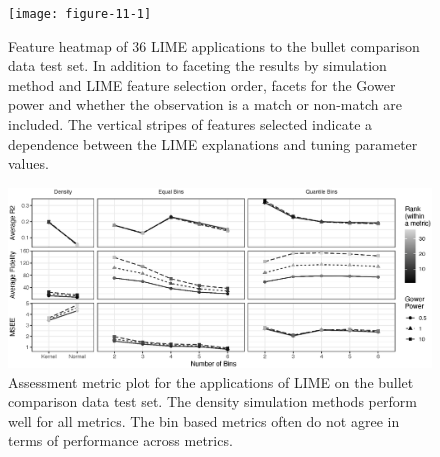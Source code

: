 \documentclass[AMS,STIX2COL]{WileyNJD-v2}\usepackage[]{graphicx}\usepackage[]{color}
\newenvironment{knitrout}{}{} %
\begin{document}
\begin{figure}[!thp]
\begin{knitrout}
\color{fgcolor}

{\centering \texttt{[image: figure-11-1]} 

}



\end{knitrout}
\caption{Feature heatmap of  36 LIME applications to the bullet comparison data test set. In addition to faceting the results by simulation method and LIME feature selection order, facets for the Gower power and whether the observation is a match or non-match are included. The vertical stripes of features selected indicate a dependence between the LIME explanations and tuning parameter values.}
\label{fig:figure-11}

\vspace*{\floatsep}

\begin{knitrout}
\color{fgcolor}

{\centering \includegraphics[width=6.5in]{figure-12-1} 

}



\end{knitrout}
\caption{Assessment metric plot for the applications of LIME on the bullet comparison data test set. The density simulation methods perform well for all metrics. The bin based metrics often do not agree in terms of performance across metrics.}
\label{fig:figure-12}
\end{figure}
\end{document}
